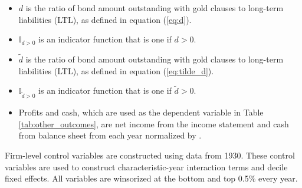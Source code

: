 \begin{itemize}
        \item $d$ is the ratio of bond amount outstanding with gold clauses to long-term liabilities (LTL), as defined in equation (\ref{eq:d}). 
        
        \item $\mathbb{I}_{d>0}$ is an indicator function that is one if $d > 0$. 

        \item $\tilde{d}$ is the ratio of bond amount outstanding with gold clauses to long-term liabilities (LTL), as defined in equation (\ref{eq:tilde_d}). 
        
        \item $\mathbb{I}_{\tilde{d}>0}$ is an indicator function that is one if $\tilde{d} > 0$. 
       
        \item Profits and cash, which are used as the dependent variable in Table \ref{tab:other_outcomes}, are net income from the income statement and cash from balance sheet from each year normalized by .
	\end{itemize}

    Firm-level control variables are constructed using data from 1930. These control variables are used to construct characteristic-year interaction terms and decile fixed effects. All variables are winsorized at the bottom and top 0.5\% every year.

